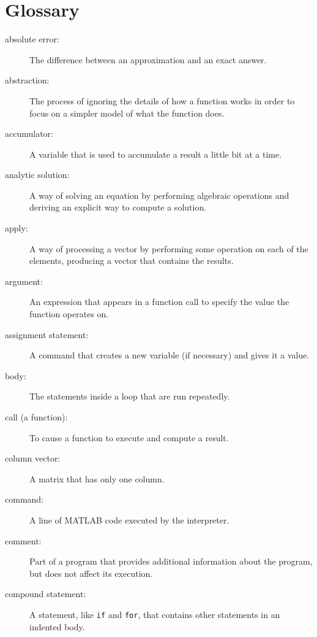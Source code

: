 

\chapter*{Glossary}

\begin{description}


\item[absolute error:] The difference between an approximation and
an exact answer.

\item[abstraction:] The process of ignoring the details of how
a function works in order to focus on a simpler model of what the
function does.

\item[accumulator:] A variable that is used to accumulate a result
a little bit at a time.

\item[analytic solution:] A way of solving an equation by performing
algebraic operations and deriving an explicit way to
compute a solution.

\item[apply:] A way of processing a vector by performing some operation
on each of the elements, producing a vector that contains the
results.

\item[argument:] An expression that appears in a function call to
specify the value the function operates on.

\item[assignment statement:] A command that creates a new variable
(if necessary) and gives it a value.

\item[body:] The statements inside a loop that are run
repeatedly.

\item[call (a function):] To cause a function to execute and compute a result.

\item[column vector:] A matrix that has only one column.

\item[command:] A line of MATLAB code executed by the interpreter.

\item[comment:] Part of a program that provides additional information
about the program, but does not affect its execution.

\item[compound statement:] A statement, like {\tt if} and {\tt for}, that
contains other statements in an indented body.


\end{description}
